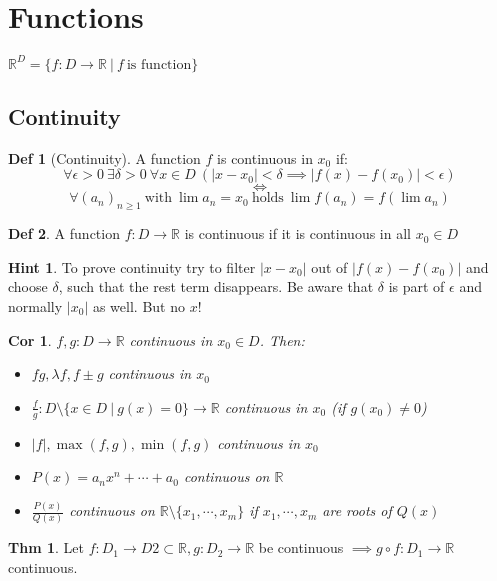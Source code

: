 \documentclass[a4paper, 10pt]{article}
\newtheorem*{corollary}{Cor}
\theoremstyle{definition}
\newtheorem*{theorem}{Thm}
\newtheorem*{definition}{Def}
\newtheorem*{note_wrapper}{Hint}
\theoremstyle{named}
\newenvironment{note}%
    {\begin{mdframed}[style=trick]\begin{note_wrapper}}%
    {\end{note_wrapper}\end{mdframed}}
\newcommand{\R}{\mathbb{R}}
\begin{document}
\section{Functions}
$\R^D = \{f: D \to \R \ | \ f \ \text{is function} \}$
\subsection{Continuity}
\begin{definition}[Continuity]
    A function $f$ is continuous in $x_0$ if:
    $$\forall \epsilon > 0 \ \exists \delta > 0 \ \forall x \in D \ (|x - x_0| < \delta \implies |f(x) - f(x_0)| < \epsilon)$$
    $$\iff$$
    $$\forall (a_n)_{n \geq 1} \ \text{with} \ \lim a_n = x_0 \ \text{holds} \ \lim f(a_n) = f(\lim a_n)$$
\end{definition}

\begin{definition}
    A function $f: D \to \R$ is continuous if it is continuous in all $x_0 \in D$
\end{definition}

\begin{note}
    To prove continuity try to filter $|x - x_0|$ out of $|f(x) - f(x_0)|$ and choose $\delta$, such that the rest term disappears. Be aware that $\delta$ is part of $\epsilon$ and normally $|x_0|$ as well. But no $x$!
\end{note}

\begin{corollary}
    $f, g: D \to \R$ continuous in $x_0 \in D$. Then:
    \begin{itemize}
        \item $fg, \lambda f, f \pm g$ continuous in $x_0$
        \item $\frac{f}{g}: D \setminus \{x \in D \ | \ g(x) = 0\} \to \R$ continuous in $x_0$ (if $g(x_0) \neq 0$)
        \item $|f|, \max(f, g), \min(f, g)$ continuous in $x_0$
        \item $P(x) = a_n x^n + \cdots + a_0$ continuous on $\R$
        \item $\frac{P(x)}{Q(x)}$ continuous on $\R \setminus \{x_1, \cdots, x_m\}$ if $x_1, \cdots, x_m$ are roots of $Q(x)$
    \end{itemize}
\end{corollary}

\begin{theorem}
    Let $f: D_1 \to D2 \subset \R, g: D_2 \to \R$ be continuous $\implies g \circ f : D_1 \to \R$ continuous.
\end{theorem}
\end{document}
